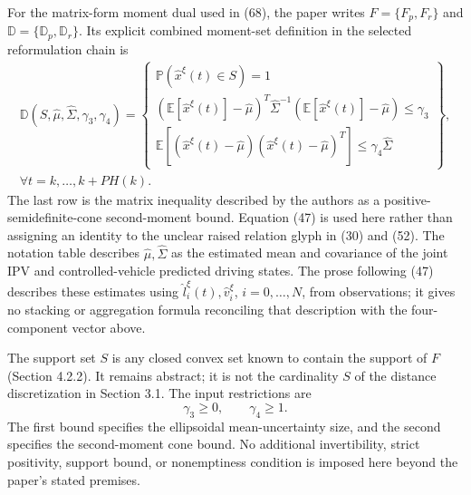 \documentclass[10pt]{article}
\begin{document}
For the matrix-form moment dual used in (68), the paper writes \(F=\{F_p,F_r\}\) and \(\mathbb D=\{\mathbb D_p,\mathbb D_r\}\). Its explicit combined moment-set definition in the selected reformulation chain is
\begin{equation}
\begin{gathered}
\mathbb D(S,\hat\mu,\hat\Sigma,\gamma_3,\gamma_4)=
\left\{\begin{array}{l}
\mathbb P(\hat x^\xi(t)\in S)=1\\
(\mathbb E[\hat x^\xi(t)]-\hat\mu)^T\hat\Sigma^{-1}
(\mathbb E[\hat x^\xi(t)]-\hat\mu)\leq\gamma_3\\
\mathbb E[(\hat x^\xi(t)-\hat\mu)(\hat x^\xi(t)-\hat\mu)^T]\leq\gamma_4\hat\Sigma
\end{array}\right\},\\
\forall t=k,\ldots,k+PH(k).
\end{gathered}
\tag{47}
\end{equation}
The last row is the matrix inequality described by the authors as a positive-semidefinite-cone second-moment bound. Equation (47) is used here rather than assigning an identity to the unclear raised relation glyph in (30) and (52). The notation table describes \(\hat\mu,\hat\Sigma\) as the estimated mean and covariance of the joint IPV and controlled-vehicle predicted driving states. The prose following (47) describes these estimates using \(\hat l_i^\xi(t),\hat v_i^\xi\), \(i=0,\ldots,N\), from observations; it gives no stacking or aggregation formula reconciling that description with the four-component vector above.

The support set \(S\) is any closed convex set known to contain the support of \(F\) (Section 4.2.2). It remains abstract; it is not the cardinality \(S\) of the distance discretization in Section 3.1. The input restrictions are
\[
\gamma_3\geq0,\qquad\gamma_4\geq1.
\]
The first bound specifies the ellipsoidal mean-uncertainty size, and the second specifies the second-moment cone bound. No additional invertibility, strict positivity, support bound, or nonemptiness condition is imposed here beyond the paper's stated premises.
\end{document}
